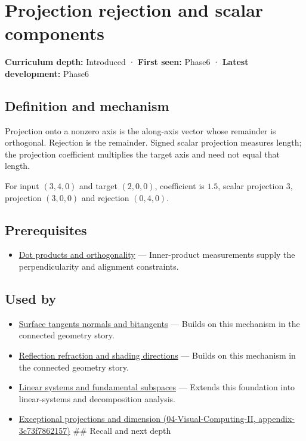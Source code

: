 \hypertarget{appendix-505a502c372a}{}
\section{Projection rejection and scalar components}\label{appendix-505a502c372a-projection-rejection-and-scalar-components}

\textbf{Curriculum depth:} Introduced · \textbf{First seen:} Phase6 · \textbf{Latest development:} Phase6

\subsection{Definition and mechanism}\label{appendix-505a502c372a-definition-and-mechanism}

Projection onto a nonzero axis is the along-axis vector whose remainder is orthogonal. Rejection is the remainder. Signed scalar projection measures length; the projection coefficient multiplies the target axis and need not equal that length.

For input \((3,4,0)\) and target \((2,0,0)\), coefficient is \(1.5\), scalar projection \(3\), projection \((3,0,0)\) and rejection \((0,4,0)\).

\subsection{Prerequisites}\label{appendix-505a502c372a-prerequisites}

\begin{itemize}
\tightlist
\item
  \hyperref[appendix-8bc4e8fc547c]{Dot products and orthogonality} --- Inner-product measurements supply the perpendicularity and alignment constraints.
\end{itemize}

\subsection{Used by}\label{appendix-505a502c372a-used-by}

\begin{itemize}
\item
  \hyperref[appendix-e31893dec985]{Surface tangents normals and bitangents} --- Builds on this mechanism in the connected geometry story.
\item
  \hyperref[appendix-44e00863b4d5]{Reflection refraction and shading directions} --- Builds on this mechanism in the connected geometry story.
\item
  \hyperref[appendix-8572a4a060c1]{Linear systems and fundamental subspaces} --- Extends this foundation into linear-systems and decomposition analysis.
\item
  \href{../04-Visual-Computing-II/main.pdf\#nameddest=appendix-3c73f7862157}{Exceptional projections and dimension (04-Visual-Computing-II, appendix-3c73f7862157)} \#\# Recall and next depth
\end{itemize}

